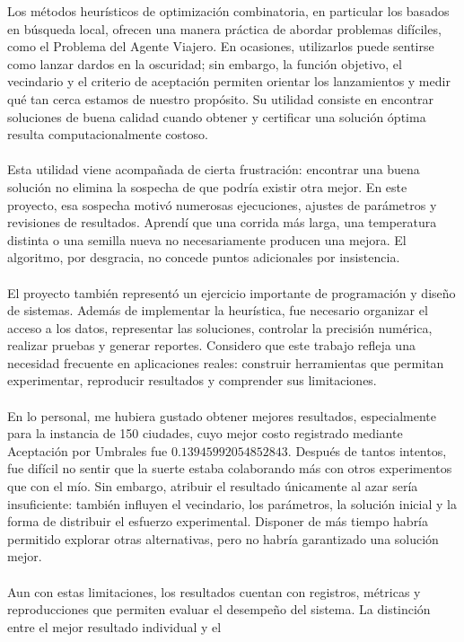 \documentclass[12pt]{article}
\begin{document}
Los métodos heurísticos de optimización combinatoria, en particular
los basados en búsqueda local, ofrecen una manera práctica de abordar
problemas difíciles, como el Problema del Agente Viajero. En ocasiones,
utilizarlos puede sentirse como lanzar dardos en la oscuridad; sin
embargo, la función objetivo, el vecindario y el criterio de aceptación
permiten orientar los lanzamientos y medir qué tan cerca estamos de
nuestro propósito. Su utilidad consiste en encontrar soluciones de
buena calidad cuando obtener y certificar una solución óptima resulta
computacionalmente costoso.
\\\\
Esta utilidad viene acompañada de cierta frustración: encontrar una
buena solución no elimina la sospecha de que podría existir otra
mejor. En este proyecto, esa sospecha motivó numerosas ejecuciones,
ajustes de parámetros y revisiones de resultados. Aprendí que una
corrida más larga, una temperatura distinta o una semilla nueva no
necesariamente producen una mejora. El algoritmo, por desgracia, no
concede puntos adicionales por insistencia.
\\\\
El proyecto también representó un ejercicio importante de programación
y diseño de sistemas. Además de implementar la heurística, fue
necesario organizar el acceso a los datos, representar las soluciones,
controlar la precisión numérica, realizar pruebas y generar reportes.
Considero que este trabajo refleja una necesidad frecuente en
aplicaciones reales: construir herramientas que permitan experimentar,
reproducir resultados y comprender sus limitaciones.
\\\\
En lo personal, me hubiera gustado obtener mejores resultados,
especialmente para la instancia de 150 ciudades, cuyo mejor costo
registrado mediante Aceptación por Umbrales fue
$0.13945992054852843$. Después de tantos intentos, fue difícil no
sentir que la suerte estaba colaborando más con otros experimentos
que con el mío. Sin embargo, atribuir el resultado únicamente al azar
sería insuficiente: también influyen el vecindario, los parámetros,
la solución inicial y la forma de distribuir el esfuerzo experimental.
Disponer de más tiempo habría permitido explorar otras alternativas,
pero no habría garantizado una solución mejor.
\\\\
Aun con estas limitaciones, los resultados cuentan con registros,
métricas y reproducciones que permiten evaluar el desempeño del
sistema. La distinción entre el mejor resultado individual y el
\end{document}
